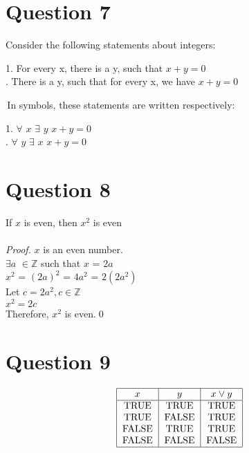 \documentclass{article}
\newcommand{\Z}{\mathbb{Z}}
\begin{document}
    \section*{Question 7}
    Consider the following statements about integers: \\ \par
    1. For every x, there is a y, such that $x + y = 0$ \\ 
    . There is a y, such that for every x, we have $x + y = 0$ \\ \par
    \,In symbols, these statements are written respectively: \\ \par
    1. $\forall$ $x$ $\exists$ $y$ $x + y = 0$ \\ 
    . $\forall$ $y$ $\exists$ $x$ $x + y = 0$ \\ 

    \section*{Question 8}
    
    If $x$ is even, then $x^2$ is even \\ \\
    \emph{Proof.} $x$ is an even number.\\
    $\exists a$ $\in\Z$ such that $x$ = $2a$ \\
    $x^2$ = $(2a)^2$ = $4a^2$ = $2(2a^2)$ \\
    Let $c = 2a^2, c\in\Z$ \\
    $x^2 = 2c$ \\
    Therefore, $x^2$ is even.\qed
    
     \section*{Question 9}
    \[\begin{tabular}{|c|c|c|}
    \hline
    $x$ & $y$ & $x\vee y$\\
    \hline
    TRUE & TRUE & TRUE \\
    TRUE & FALSE & TRUE \\
    FALSE & TRUE & TRUE \\
    FALSE & FALSE & FALSE\\
    \hline
    \end{tabular}\]
       
\end{document}
